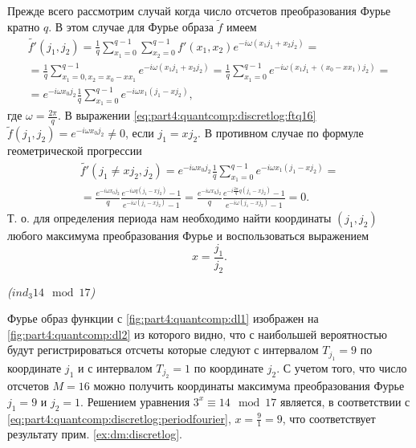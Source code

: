 Прежде всего рассмотрим случай когда число отсчетов преобразования
Фурье кратно $q$. В этом случае для Фурье образа $\tilde{f}$ имеем
\begin{eqnarray}
\tilde{f'}\left(j_1, j_2\right) = 
\frac{1}{q}\sum_{x_1 = 0}^{q-1}\sum_{x_2 = 0}^{q-1} 
f'\left(x_1, x_2\right)e^{-i \omega\left(x_1 j_1 + x_2j_2\right)} =
\nonumber \\
= \frac{1}{q}\sum_{x_1 = 0, x_2 = x_0 - x x_1}^{q-1}
e^{-i \omega\left(x_1 j_1 + x_2 j_2\right)} = 
 \frac{1}{q}\sum_{x_1 = 0}^{q-1}e^{-i \omega\left(x_1 j_1 + (x_0 - x
   x_1) j_2\right)} = 
\nonumber \\
= e^{-i \omega x_0 j_2}\frac{1}{q}\sum_{x_1 = 0}^{q-1}e^{-i
  \omega x_1 \left(j_1 - x j_2\right)},
\label{eq:part4:quantcomp:discretlog:ftq16}
\end{eqnarray}
где $\omega = \frac{2 \pi}{q}$. В выражении
\eqref{eq:part4:quantcomp:discretlog:ftq16} $\tilde{f}(j_1, j_2) =
e^{-i \omega x_0 j_2} \ne 0$, если $j_1 = x j_2$. 
В противном случае по формуле геометрической прогрессии 
\begin{eqnarray}
\tilde{f'}\left(j_1 \ne x j_2, j_2\right) = 
e^{-i \omega x_0 j_2}\frac{1}{q}\sum_{x_1 = 0}^{q-1}e^{-i
  \omega x_1 \left(j_1 - x j_2\right)} = 
\nonumber \\
=
\frac{e^{-i \omega x_0 j_2}}{q} \frac{e^{-i
  \omega q \left(j_1 - x j_2\right)} - 1}{e^{-i
  \omega \left(j_1 - x j_2\right)} - 1} = 
 \frac{e^{-i \omega x_0 j_2}}{q} 
\frac{e^{-i \frac{2 \pi}{q} q \left(j_1 - x j_2\right)} - 1}{e^{-i
  \omega \left(j_1 - x j_2\right)} - 1} = 0.
\nonumber
\end{eqnarray} 
Т. о. для определения периода нам необходимо найти координаты $(j_1, j_2)$
любого максимума преобразования Фурье и воспользоваться выражением 
\begin{equation}
x = \frac{j_1}{j_2}.
\label{eq:part4:quantcomp:discretlog:periodfourier}
\end{equation}

\begin{example}
\emph{($ind_3{14} \mod{17}$)}
%



Фурье образ функции с \autoref{fig:part4:quantcomp:dl1} изображен на
\autoref{fig:part4:quantcomp:dl2} из которого видно, что с наибольшей
вероятностью будут регистрироваться отсчеты которые следуют с
интервалом $T_{j_1} = 9$ по координате $j_1$ и с интервалом $T_{j_2} =
1$ по координате $j_2$. С учетом того, что число отсчетов $M=16$ можно
получить координаты максимума преобразования Фурье $j_1 = 9$
и $j_2 = 1$. Решением уравнения $3^x \equiv 14 \mod 17$
является, в соответствии с
\eqref{eq:part4:quantcomp:discretlog:periodfourier}, $x = \frac{9}{1}
= 9$, что соответствует результату прим. 
\ref{ex:dm:discretlog}.

\label{ex:part4:quantcomp:discretlog:periodfinding}
\end{example}

